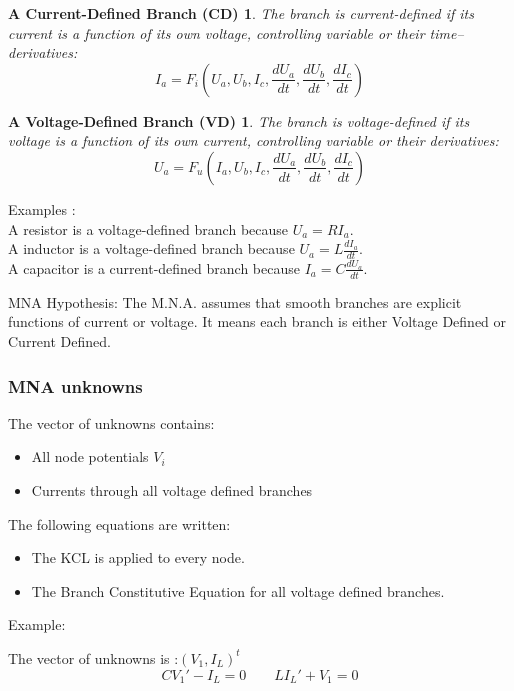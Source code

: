 \frame
{
\newtheorem{mur}{A Current-Defined Branch (CD)}
\begin{mur}
The branch is current-defined if its current is a function of its own voltage, controlling variable
or their time--derivatives:
\begin{equation}\label{CD}I_{a}=F_{i}(U_{a},U_{b},I_{c},\frac{dU_a}{dt},\frac{dU_b}{dt},\frac{dI_{c}}{dt})\end{equation}
\end{mur}
\newtheorem{mur_}{A Voltage-Defined Branch (VD)}
\begin{mur_}
The branch is voltage-defined if its voltage is a function of its own current, controlling variable
or their derivatives:
\begin{equation}\label{VD}U_{a}=F_{u}(I_{a},U_{b},I_{c},\frac{dU_a}{dt},\frac{dU_b}{dt},\frac{dI_{c}}{dt})\end{equation}
\end{mur_}
Examples : \\
A resistor is a voltage-defined branch because $U_{a}=RI_{a}$.\\
A inductor is a voltage-defined branch because $U_{a}=L\frac{dI_{a}}{dt}$.\\
A capacitor is a current-defined branch because $I_{a}=C\frac{dU_{a}}{dt}$.\\

 \begin{block}{MNA Hypothesis:}
The M.N.A. assumes that smooth branches are explicit functions of current or voltage. It means each
branch is either Voltage Defined or Current Defined.
  \end{block}
}
\frame
{
\frametitle{MNA unknowns}
 \begin{block}{The vector of unknowns contains:}
\begin{itemize}
\item All node potentials $V_{i}$
\item Currents through all voltage defined branches
\end{itemize}
\end{block}

 \begin{block}{The following equations are written:}
\begin{itemize}
\item The KCL is applied to every node.
\item The Branch Constitutive Equation for all voltage defined branches.
\end{itemize}
\end{block}
Example:
  \begin{figure}[h]
   \centerline{
   \scalebox{0.5}{
    
  }
 } 
 \end{figure}

The vector of unknowns is :$(V_{1},I_{L})^{t}$
\[CV_{1}'-I_{L}=0 \qquad LI_{L}'+V_{1}=0\]

}
